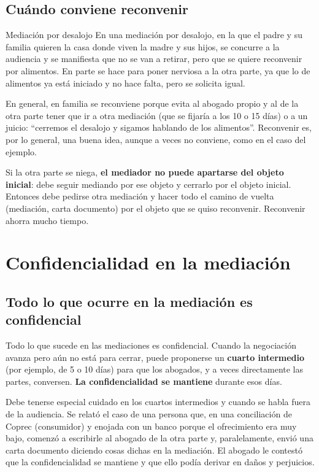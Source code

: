 \documentclass[12pt,oneside]{book}
\begin{document}
\subsection{Cuándo conviene reconvenir}

\begin{example}{Mediación por desalojo}
En una mediación por desalojo, en la que el padre y su familia quieren la casa donde viven la madre y sus hijos, se concurre a la audiencia y se manifiesta que no se van a retirar, pero que se quiere reconvenir por alimentos. En parte se hace para poner nerviosa a la otra parte, ya que lo de alimentos ya está iniciado y no hace falta, pero se solicita igual.
\end{example}

En general, en familia se reconviene porque evita al abogado propio y al de la otra parte tener que ir a otra mediación (que se fijaría a los 10 o 15 días) o a un juicio: ``cerremos el desalojo y sigamos hablando de los alimentos''. Reconvenir es, por lo general, una buena idea, aunque a veces no conviene, como en el caso del ejemplo.

Si la otra parte se niega, \textbf{el mediador no puede apartarse del objeto inicial}: debe seguir mediando por ese objeto y cerrarlo por el objeto inicial. Entonces debe pedirse otra mediación y hacer todo el camino de vuelta (mediación, carta documento) por el objeto que se quiso reconvenir. Reconvenir ahorra mucho tiempo.

\section{Confidencialidad en la mediación}

\subsection{Todo lo que ocurre en la mediación es confidencial}

Todo lo que sucede en las mediaciones es confidencial. Cuando la negociación avanza pero aún no está para cerrar, puede proponerse un \textbf{cuarto intermedio} (por ejemplo, de 5 o 10 días) para que los abogados, y a veces directamente las partes, conversen. \textbf{La confidencialidad se mantiene} durante esos días.

Debe tenerse especial cuidado en los cuartos intermedios y cuando se habla fuera de la audiencia. Se relató el caso de una persona que, en una conciliación de Coprec (consumidor) y enojada con un banco porque el ofrecimiento era muy bajo, comenzó a escribirle al abogado de la otra parte y, paralelamente, envió una carta documento diciendo cosas dichas en la mediación. El abogado le contestó que la confidencialidad se mantiene y que ello podía derivar en daños y perjuicios.
\end{document}
